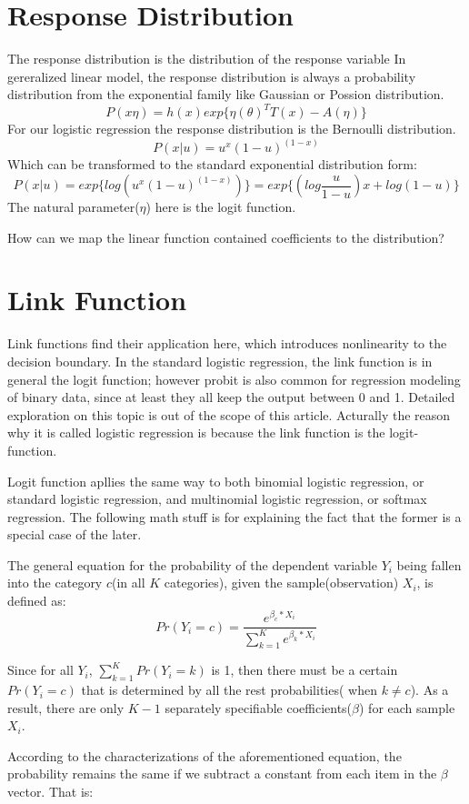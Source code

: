 \documentclass[a4paper]{article}
\begin{document}
\section{Response Distribution}
The response distribution is the distribution of the response variable 
In gereralized linear model, the response distribution is always a probability distribution from the exponential family like Gaussian or Possion distribution.
$$P(x\eta) = h(x)exp\{\eta(\theta)^T T(x)-A(\eta)\}$$
For our logistic regression the response distribution is the Bernoulli distribution. 
$$P(x|u)=u^x(1-u)^{(1-x)}$$
Which can be transformed to the standard exponential distribution form: 
$$P(x|u) = exp\{log(u^x(1-u)^{(1-x)})\}=exp\{(log \frac{u}{1-u})x + log(1-u)\}$$
The natural parameter($\eta$) here is the logit function.

How can we map the linear function contained coefficients to the distribution?

\section{Link Function}
Link functions find their application here, which introduces nonlinearity to the decision boundary.
In the standard logistic regression, the link function is in general the logit function; however probit is also common for regression modeling of binary data, since at least they all keep the output between 0 and 1. Detailed exploration on this topic is out of the scope of this article. Acturally the reason why it is called logistic regression is because the link function is the logit-function. 

Logit function apllies the same way to both binomial logistic regression, or standard logistic regression, and multinomial logistic regression, or softmax regression. The following math stuff is for explaining the fact that the former is a special case of the later.

The general equation for the probability of the dependent variable $Y_i$ being fallen into the category $c$(in all $K$ categories), given the sample(observation) $X_i$, is defined as:  
$$Pr(Y_i=c) = \frac{e^{\beta_c*X_i}}{\sum^K_{k=1}e^{\beta_k*X_i}}$$

Since for all $Y_i$, $\sum^K_{k=1}Pr(Y_i=k)$ is 1, then there must be a certain $Pr(Y_i=c)$ that is determined by all the rest probabilities( when $k\neq c$). As a result, there are only $K-1$ separately specifiable coefficients($\beta$) for each sample $X_i$.   

According to the characterizations of the aforementioned equation, the probability remains the same if we subtract a constant from each item in the $\beta$ vector. That is:  
\end{document}
